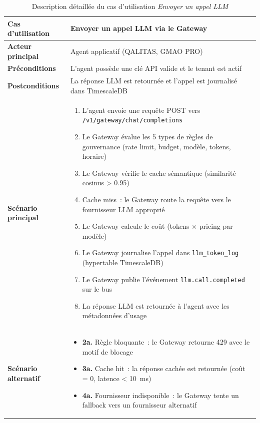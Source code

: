 \begin{table}[H]
\centering
\caption{Description détaillée du cas d'utilisation \textit{Envoyer un appel LLM}}
\label{tab:uc_desc_gateway}
\begin{tabularx}{\textwidth}{|l|X|}
\hline
\textbf{Cas d'utilisation} & Envoyer un appel LLM via le Gateway \\
\hline
\textbf{Acteur principal} & Agent applicatif (QALITAS, GMAO PRO) \\
\hline
\textbf{Préconditions} & L'agent possède une clé API valide et le tenant est actif \\
\hline
\textbf{Postconditions} & La réponse LLM est retournée et l'appel est journalisé dans TimescaleDB \\
\hline
\textbf{Scénario principal} & \begin{minipage}[t]{\linewidth}\vspace{2pt}
\begin{enumerate}[noitemsep,topsep=0pt]
\item L'agent envoie une requête POST vers \texttt{/v1/gateway/chat/completions}
\item Le Gateway évalue les 5 types de règles de gouvernance (rate limit, budget, modèle, tokens, horaire)
\item Le Gateway vérifie le cache sémantique (similarité cosinus > 0.95)
\item Cache miss~: le Gateway route la requête vers le fournisseur LLM approprié
\item Le Gateway calcule le coût (tokens $\times$ pricing par modèle)
\item Le Gateway journalise l'appel dans \texttt{llm\_token\_log} (hypertable TimescaleDB)
\item Le Gateway publie l'événement \texttt{llm.call.completed} sur le bus
\item La réponse LLM est retournée à l'agent avec les métadonnées d'usage
\end{enumerate}\vspace{2pt}
\end{minipage} \\
\hline
\textbf{Scénario alternatif} & \begin{minipage}[t]{\linewidth}\vspace{2pt}
\begin{itemize}[noitemsep,topsep=0pt]
\item \textbf{2a.} Règle bloquante~: le Gateway retourne 429 avec le motif de blocage
\item \textbf{3a.} Cache hit~: la réponse cachée est retournée (coût = 0, latence < 10~ms)
\item \textbf{4a.} Fournisseur indisponible~: le Gateway tente un fallback vers un fournisseur alternatif
\end{itemize}\vspace{2pt}
\end{minipage} \\
\hline
\end{tabularx}
\end{table}


